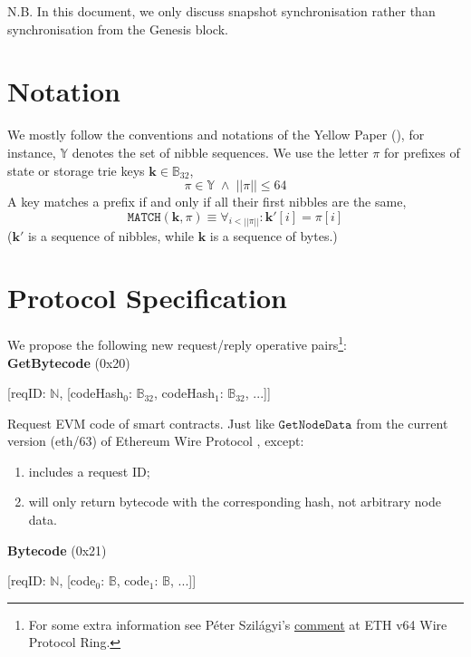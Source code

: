 \documentclass{amsart}
\begin{document}
N.B. In this document, we only discuss snapshot synchronisation rather than synchronisation from the Genesis block.

\section{Notation}

We mostly follow the conventions and notations of the Yellow Paper (\cite{yellow_paper}),
for instance, $\mathbb{Y}$ denotes the set of nibble sequences.
We use the letter $\pi$ for prefixes of state or storage trie keys $\mathbf{k} \in \mathbb{B}_{32}$,
\begin{equation}
    \pi \in \mathbb{Y} \; \land \; ||\pi|| \leq 64
\end{equation}
A key matches a prefix if and only if all their first nibbles are the same,
\begin{equation}
    \texttt{MATCH}(\mathbf{k}, \pi) \equiv \forall_{i < ||\pi||}: \mathbf{k}'[i] = \pi[i]
\end{equation}
($\mathbf{k}'$ is a sequence of nibbles, while $\mathbf{k}$ is a sequence of bytes.)

\section{Protocol Specification}

We propose the following new request/reply operative pairs\footnote{For
some extra information see Péter Szilágyi's
\href{https://ethereum-magicians.org/t/forming-a-ring-eth-v64-wire-protocol-ring/2857/10}{comment}
at ETH v64 Wire Protocol Ring.}:\\

\textbf{GetBytecode} (0x20)

[reqID: $\mathbb{N}$,
[codeHash$_0$: $\mathbb{B}_{32}$, codeHash$_1$: $\mathbb{B}_{32}$, ...]]
\medskip

Request EVM code of smart contracts.
Just like $\texttt{GetNodeData}$ from the current version (eth/63) of Ethereum Wire Protocol \cite{wire_protocol}, except:
\begin{enumerate}
\item includes a request ID;
\item will only return bytecode with the corresponding hash, not arbitrary node data.
\end{enumerate}
\bigskip

\textbf{Bytecode} (0x21)

[reqID: $\mathbb{N}$,
[code$_0$: $\mathbb{B}$, code$_1$: $\mathbb{B}$, ...]]
\medskip
\end{document}
